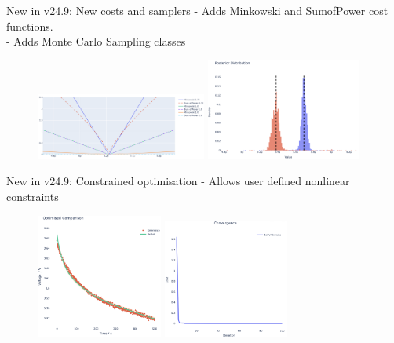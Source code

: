 \documentclass[aspectratio=169]{beamer}
\begin{document}
\begin{frame}[fragile,t]{New in v24.9: New costs and samplers}
    \vspace{-6mm}
     - Adds Minkowski and SumofPower cost functions. \\
     - Adds Monte Carlo Sampling classes

    \begin{figure}
        \centering
        \includegraphics[width=0.5\textwidth]{Images/Highlights/minkowski-sum-of-power.png}
        \hspace{1em}
        \includegraphics[width=0.455\textwidth]{Images/Highlights/SPMe posterior.png}
        \label{fig:optimisersNew}
    \end{figure}
\end{frame}

\begin{frame}[fragile,t]{New in v24.9: Constrained optimisation}
    \vspace{-6mm}
     - Allows user defined nonlinear constraints

    \begin{figure}
        \centering
        \includegraphics[width=0.37\textwidth]{Images/Highlights/trust-const-identification.png}
        \hspace{3em}
        \includegraphics[width=0.37\textwidth]{Images/Highlights/trust-const-convergence.png}
        \label{fig:WeppnerHuggins}
    \end{figure}
\end{frame}
\end{document}
